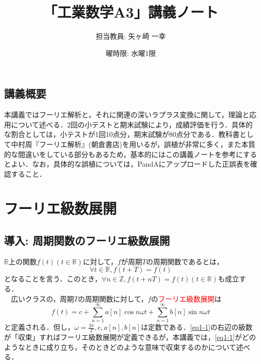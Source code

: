 \documentclass[a4j]{jsbook}
\title{「工業数学A3」講義ノート}
\author{担当教員: 矢ヶ崎 一幸}
\date{曜時限: 水曜1限}
\numberwithin{theorem}{chapter}  %
\begin{document}
\maketitle

\tableofcontents

\newpage

\section*{講義概要}
本講義ではフーリエ解析と，それに関連の深いラプラス変換に関して，理論と応用について述べる．2回の小テストと期末試験により，成績評価を行う．具体的な割合としては，小テストが1回10点分，期末試験が80点分である．教科書として中村周『フーリエ解析』(朝倉書店)を用いるが，誤植が非常に多く，また本質的な間違いをしている部分もあるため，基本的にはこの講義ノートを参考にするとよい．なお，具体的な誤植については，PandAにアップロードした正誤表を確認すること．

\chapter{フーリエ級数展開} \label{chap1}
\section{導入: 周期関数のフーリエ級数展開} \label{sec1-1}
\(\mathbb{R}\)上の関数\(f(t)(t\in\mathbb{R})\)に対して，\(f\)が周期\(T\)の周期関数であるとは，
\begin{equation*}
    \forall t\in\mathbb{R}, f(t+T)=f(t)
\end{equation*}
となることを言う．このとき，\(\forall n\in\mathbb{Z}, f(t+nT)=f(t)(t\in\mathbb{R})\)も成立する．\\
　広いクラスの，周期\(T\)の周期関数に対して，\(f\)の\textcolor{red}{フーリエ級数展開}は
\begin{equation}
    f(t)=c+\sum_{n=1}^\infty a[n]\cos n\omega t+\sum_{n=1}^\infty b[n]\sin n\omega t \label{eq1-1}
\end{equation}
と定義される．但し，\(\displaystyle \omega=\frac{2\pi}{T}, c, a[n], b[n]\)は定数である．\eqref{eq1-1}の右辺の級数が「収束」すればフーリエ級数展開が定義できるが，本講義では，\eqref{eq1-1}がどのようなときに成り立ち，そのときどのような意味で収束するのかについて述べる．
\end{document}
